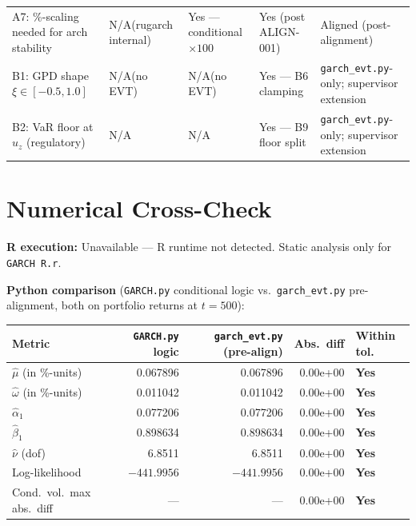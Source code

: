 \documentclass[11pt,a4paper]{article}
\newcommand{\code}[1]{\texttt{#1}}
\newcommand{\yes}{\textbf{Yes}}
\newcommand{\na}{N/A}
\begin{document}
\begin{footnotesize}
\begin{longtable}{@{}p{4.0cm} p{1.8cm} p{1.8cm} p{2.8cm} p{3.0cm}@{}}
A7: \%-scaling needed for arch stability &
  \na (rugarch internal) &
  Yes --- conditional $\times100$ &
  Yes (post ALIGN-001) &
  Aligned (post-alignment) \\[3pt]

B1: GPD shape $\xi \in [-0.5, 1.0]$ &
  \na (no EVT) &
  \na (no EVT) &
  Yes --- B6 clamping &
  \code{garch\_evt.py}-only; supervisor extension \\[3pt]

B2: VaR floor at $u_z$ (regulatory) &
  \na &
  \na &
  Yes --- B9 floor split &
  \code{garch\_evt.py}-only; supervisor extension \\[3pt]

\end{longtable}
\end{footnotesize}

\section{Numerical Cross-Check}\label{sec:numerical}

\textbf{R execution:} Unavailable --- R runtime not detected. Static analysis
only for \code{GARCH R.r}.

\textbf{Python comparison} (\code{GARCH.py} conditional logic vs.\
\code{garch\_evt.py} pre-alignment, both on portfolio returns at $t = 500$):

\begin{center}
\begin{tabular}{@{}lrrrl@{}}
\toprule
\textbf{Metric} & \textbf{\code{GARCH.py} logic} & \textbf{\code{garch\_evt.py} (pre-align)} &
\textbf{Abs.\ diff} & \textbf{Within tol.} \\
\midrule
$\hat{\mu}$ (in \%-units)    & 0.067896 & 0.067896 & 0.00e+00 & \yes \\
$\hat{\omega}$ (in \%-units) & 0.011042 & 0.011042 & 0.00e+00 & \yes \\
$\hat{\alpha}_1$             & 0.077206 & 0.077206 & 0.00e+00 & \yes \\
$\hat{\beta}_1$              & 0.898634 & 0.898634 & 0.00e+00 & \yes \\
$\hat{\nu}$ (dof)            & 6.8511   & 6.8511   & 0.00e+00 & \yes \\
Log-likelihood               & $-441.9956$ & $-441.9956$ & 0.00e+00 & \yes \\
Cond.\ vol.\ max abs.\ diff  & ---      & ---      & 0.00e+00 & \yes \\
\bottomrule
\end{tabular}
\end{center}
\end{document}
